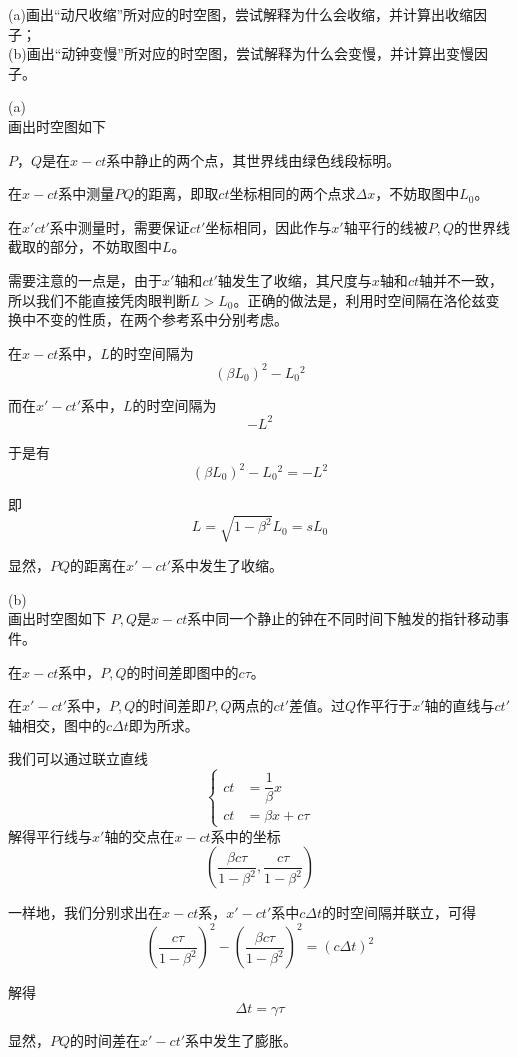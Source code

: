 \begin{ex}
    (a)画出“动尺收缩”所对应的时空图，尝试解释为什么会收缩，并计算出收缩因子；
    \\(b)画出“动钟变慢”所对应的时空图，尝试解释为什么会变慢，并计算出变慢因子。
\end{ex}
\begin{so}
    (a)\\
    画出时空图如下

    $P$，$Q$是在$x-ct$系中静止的两个点，其世界线由绿色线段标明。

    在$x-ct$系中测量$PQ$的距离，即取$ct$坐标相同的两个点求$\Delta x$，不妨取图中$L_0$。

    在$x'ct'$系中测量时，需要保证$ct'$坐标相同，因此作与$x'$轴平行的线被$P,Q$的世界线截取的部分，不妨取图中$L$。

    需要注意的一点是，由于$x'$轴和$ct'$轴发生了收缩，其尺度与$x$轴和$ct$轴并不一致，所以我们不能直接凭肉眼判断$L>L_0$。正确的做法是，利用时空间隔在洛伦兹变换中不变的性质，在两个参考系中分别考虑。

    在$x-ct$系中，$L$的时空间隔为\[(\beta L_0)^2-L_0{}^2\]

    而在$x'-ct'$系中，$L$的时空间隔为\[-L^2\]

    于是有\[(\beta L_0)^2-L_0{}^2=-L^2\]

    即\[L=\sqrt{1-\beta^2}L_0=sL_0\]

    显然，$PQ$的距离在$x'-ct'$系中发生了收缩。

    (b)\\
    画出时空图如下
    $P,Q$是$x-ct$系中同一个静止的钟在不同时间下触发的指针移动事件。

    在$x-ct$系中，$P,Q$的时间差即图中的$c\tau$。

    在$x'-ct'$系中，$P,Q$的时间差即$P,Q$两点的$ct'$差值。过$Q$作平行于$x'$轴的直线与$ct'$轴相交，图中的$c\Delta t$即为所求。

    我们可以通过联立直线
    \[\left\{
        \begin{aligned}
            ct & = \dfrac{1}{\beta} x \\
            ct & = \beta x + c\tau
        \end{aligned}
        \right.\]
    解得平行线与$x'$轴的交点在$x-ct$系中的坐标
    \[\left(\dfrac{\beta c\tau}{1-\beta^2},\dfrac{c\tau}{1-\beta^2}\right)\]

    一样地，我们分别求出在$x-ct$系，$x'-ct'$系中$c\Delta t$的时空间隔并联立，可得
    \[\left(\dfrac{c\tau}{1-\beta^2}\right)^2-\left(\dfrac{\beta c\tau}{1-\beta^2}\right)^2=(c\Delta t)^2\]

    解得
    \[\Delta t = \gamma \tau\]

    显然，$PQ$的时间差在$x'-ct'$系中发生了膨胀。
\end{so}

